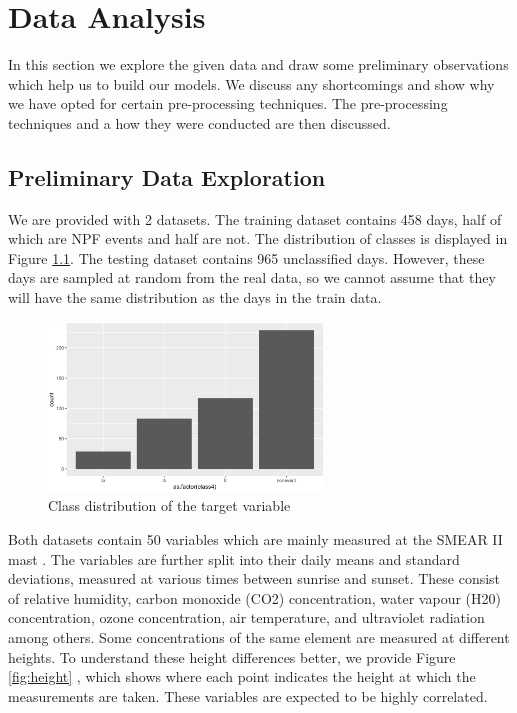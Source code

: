 \chapter{Data Analysis}

In this section we explore the given data and draw some preliminary observations which help us to build our models. We discuss any shortcomings and show why we have opted for certain pre-processing techniques. The pre-processing techniques and a how they were conducted are then discussed.

\section{Preliminary Data Exploration}

We are provided with 2 datasets. The training dataset contains 458 days, half of which are NPF events and half are not. The distribution of classes is displayed in Figure \ref{fig:class_distribution}. The testing dataset contains 965 unclassified days. However, these days are sampled at random from the real data, so we cannot assume that they will have the same distribution as the days in the train data.

\begin{figure}[!ht]
   \centering
   \includegraphics[width=0.65\textwidth]{images/class_distribution.png}
   \caption{Class distribution of the target variable}
   \label{fig:class_distribution}
\end{figure}


Both datasets contain 50 variables which are mainly measured at the SMEAR II mast \cite{npf_paper}. The variables are further split into their daily means and standard deviations, measured at various times between sunrise and sunset. These consist of relative humidity, carbon monoxide (CO2) concentration, water vapour (H20) concentration, ozone concentration, air temperature, and ultraviolet radiation among others. Some concentrations of the same element are measured at different heights. To understand these height differences better, we provide Figure \ref{fig:height} , which shows where each point indicates the height at which the measurements are taken. These variables are expected to be highly correlated.

